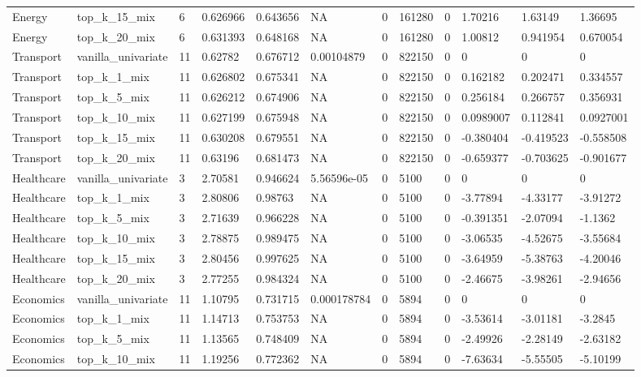 \begin{tabular}{llllllllllll}
Energy & top\_k\_15\_mix & 6 & 0.626966 & 0.643656 & NA & 0 & 161280 & 0 & 1.70216 & 1.63149 & 1.36695 \\
Energy & top\_k\_20\_mix & 6 & 0.631393 & 0.648168 & NA & 0 & 161280 & 0 & 1.00812 & 0.941954 & 0.670054 \\
Transport & vanilla\_univariate & 11 & 0.62782 & 0.676712 & 0.00104879 & 0 & 822150 & 0 & 0 & 0 & 0 \\
Transport & top\_k\_1\_mix & 11 & 0.626802 & 0.675341 & NA & 0 & 822150 & 0 & 0.162182 & 0.202471 & 0.334557 \\
Transport & top\_k\_5\_mix & 11 & 0.626212 & 0.674906 & NA & 0 & 822150 & 0 & 0.256184 & 0.266757 & 0.356931 \\
Transport & top\_k\_10\_mix & 11 & 0.627199 & 0.675948 & NA & 0 & 822150 & 0 & 0.0989007 & 0.112841 & 0.0927001 \\
Transport & top\_k\_15\_mix & 11 & 0.630208 & 0.679551 & NA & 0 & 822150 & 0 & -0.380404 & -0.419523 & -0.558508 \\
Transport & top\_k\_20\_mix & 11 & 0.63196 & 0.681473 & NA & 0 & 822150 & 0 & -0.659377 & -0.703625 & -0.901677 \\
Healthcare & vanilla\_univariate & 3 & 2.70581 & 0.946624 & 5.56596e-05 & 0 & 5100 & 0 & 0 & 0 & 0 \\
Healthcare & top\_k\_1\_mix & 3 & 2.80806 & 0.98763 & NA & 0 & 5100 & 0 & -3.77894 & -4.33177 & -3.91272 \\
Healthcare & top\_k\_5\_mix & 3 & 2.71639 & 0.966228 & NA & 0 & 5100 & 0 & -0.391351 & -2.07094 & -1.1362 \\
Healthcare & top\_k\_10\_mix & 3 & 2.78875 & 0.989475 & NA & 0 & 5100 & 0 & -3.06535 & -4.52675 & -3.55684 \\
Healthcare & top\_k\_15\_mix & 3 & 2.80456 & 0.997625 & NA & 0 & 5100 & 0 & -3.64959 & -5.38763 & -4.20046 \\
Healthcare & top\_k\_20\_mix & 3 & 2.77255 & 0.984324 & NA & 0 & 5100 & 0 & -2.46675 & -3.98261 & -2.94656 \\
Economics & vanilla\_univariate & 11 & 1.10795 & 0.731715 & 0.000178784 & 0 & 5894 & 0 & 0 & 0 & 0 \\
Economics & top\_k\_1\_mix & 11 & 1.14713 & 0.753753 & NA & 0 & 5894 & 0 & -3.53614 & -3.01181 & -3.2845 \\
Economics & top\_k\_5\_mix & 11 & 1.13565 & 0.748409 & NA & 0 & 5894 & 0 & -2.49926 & -2.28149 & -2.63182 \\
Economics & top\_k\_10\_mix & 11 & 1.19256 & 0.772362 & NA & 0 & 5894 & 0 & -7.63634 & -5.55505 & -5.10199 \\

\end{tabular}
